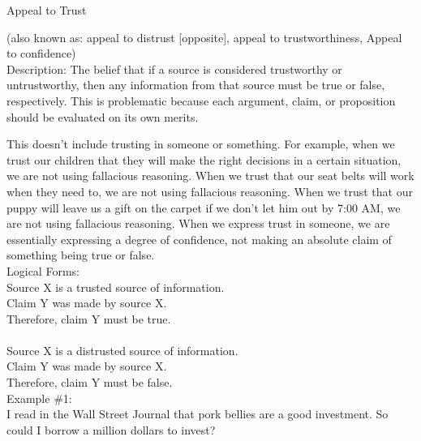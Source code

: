 \documentclass[a4paper,12pt,single,pdftex]{scrartcl}
\begin{document}
  

Appeal to Trust
    
      (also known as: appeal to distrust [opposite], appeal to trustworthiness, Appeal to confidence)
    \\

  
    Description: The belief that if a source is considered trustworthy or untrustworthy, then any information from that source must be true or false, respectively. This is problematic because each argument, claim, or proposition should be evaluated on its own merits.

    
      This doesn't include trusting in someone or something. For example, when we trust our children that they will make the right decisions in a certain situation, we are not using fallacious reasoning. When we trust that our seat belts will work when they need to, we are not using fallacious reasoning. When we trust that our puppy will leave us a gift on the carpet if we don't let him out by 7:00 AM, we are not using fallacious reasoning. When we express trust in someone, we are essentially expressing a degree of confidence, not making an absolute claim of something being true or false.
    \\

    
      Logical Forms:
    \\

    
      Source X is a trusted source of information.
    \\

    
      Claim Y was made by source X.
    \\

    
      Therefore, claim Y must be true.
    \\

    
       
    \\

    
      Source X is a distrusted source of information.
    \\

    
      Claim Y was made by source X.
    \\

    
      Therefore, claim Y must be false.
    \\

    
      Example \#1:
    \\

    
      I read in the Wall Street Journal that pork bellies are a good investment. So could I borrow a million dollars to invest?
    \\
\end{document}

